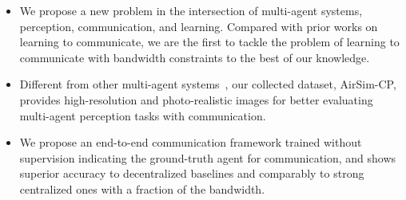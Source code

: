 \begin{itemize}

\item We propose a new problem in the intersection of multi-agent systems, perception, communication, and learning. Compared with prior works on learning to communicate, we are the first to tackle the problem of learning to communicate with bandwidth constraints to the best of our knowledge. 

\item  Different from other multi-agent systems~\cite{hoshen2017vain,jiang2018learning}, our collected dataset, AirSim-CP, provides high-resolution and photo-realistic images for better evaluating multi-agent perception tasks with communication.

\item We propose an end-to-end communication framework trained without supervision indicating the ground-truth agent for communication, and shows superior accuracy to decentralized baselines and comparably to strong centralized ones with a fraction of the bandwidth.

\end{itemize}
